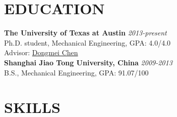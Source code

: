 \documentclass[margin, 9pt]{res} %
\begin{document}
\begin{resume}


\vspace*{-5pt}




\section{EDUCATION}

\textbf{The University of Texas at Austin} \hfill\textit{2013-present}\\
Ph.D. student, Mechanical Engineering, GPA: 4.0/4.0\\
Advisor: \href{http://www.me.utexas.edu/~apscl/people.html}{Dongmei Chen}\\

\vspace*{-5pt}
\textbf{Shanghai Jiao Tong University, China} \hfill\textit{2009-2013}\\
B.S., Mechanical Engineering, GPA: 91.07/100\\

\section{SKILLS}


\end{resume}
\end{document}
